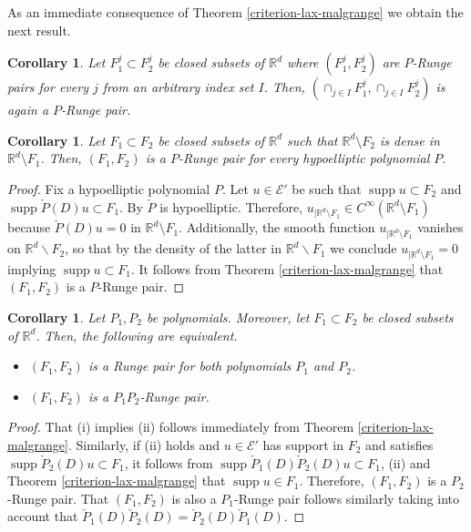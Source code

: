 \documentclass[10pt,leqno]{amsart}
\newtheorem{corollary}[prop]{Corollary}
\theoremstyle{definition}
\newcommand{\R}{\mathbb R}
\newcommand{\supp}{\operatorname{supp}}
\begin{document}
As an immediate consequence of Theorem \ref{criterion-lax-malgrange} we obtain the next result.

\begin{corollary}\label{corollary:intersections}
	Let $F^j_1\subset F^j_2$ be closed subsets of $\R^d$ where $(F_1^j,F_2^j)$ are $P$-Runge pairs for every $j$ from an arbitrary index set $I$. Then, $\left(\cap_{j\in I}F_1^j, \cap_{j\in I}F_2^j\right)$ is again a $P$-Runge pair.
\end{corollary}

\begin{corollary}\label{corollary:general result for hypoelliptic}
	Let $F_1\subset F_2$ be closed subsets of $\R^d$ such that $\R^d\setminus F_2$ is dense in $\R^d\setminus F_1$. Then, $(F_1, F_2)$ is a $P$-Runge pair for every hypoelliptic polynomial $P$.
\end{corollary}

\begin{proof}
	Fix a hypoelliptic polynomial $P$. Let $u\in\mathscr{E}'$ be such that $\supp u\subset F_2$ and $\supp\check{P}(D)u\subset F_1$. By \cite[Theorem 11.1.3]{Hor2} $\check{P}$ is hypoelliptic. Therefore, $u_{\mid\R^d\setminus F_1}\in C^\infty(\R^d\setminus F_1)$ because $\check{P}(D)u=0$ in $\R^d\setminus F_1$. Additionally, the smooth function $u_{\mid\R^d\setminus F_1}$ vanishes on $\R^d\backslash F_2$, so that by the density of the latter in $\R^d\backslash F_1$ we conclude $u_{\mid\R^d\setminus F_1}=0$ implying $\supp u\subset F_1$. It follows from Theorem \ref{criterion-lax-malgrange} that $(F_1, F_2)$ is a $P$-Runge pair.
\end{proof}

\begin{corollary}\label{corollary:compositions}
	Let $P_1,P_2$ be polynomials. Moreover, let $F_1\subset F_2$ be closed subsets of $\R^d$. Then, the following are equivalent.
	\begin{itemize}
		\item[(i)] $(F_1, F_2)$ is a Runge pair for both polynomials $P_1$ and $P_2$.
		\item[(ii)] $(F_1, F_2)$ is a $P_1 P_2$-Runge pair. 
	\end{itemize}
\end{corollary}

\begin{proof}
	That (i) implies (ii) follows immediately from Theorem \ref{criterion-lax-malgrange}. Similarly, if (ii) holds and $u\in\mathscr{E}'$ has support in $F_2$ and satisfies $\supp \check{P}_2(D)u\subset F_1$, it follows from $\supp \check{P}_1(D)\check{P}_2(D)u\subset F_1$, (ii) and Theorem \ref{criterion-lax-malgrange} that $\supp u\in F_1$. Therefore, $(F_1, F_2)$ is a $P_2$-Runge pair. That $(F_1, F_2)$ is also a $P_1$-Runge pair follows similarly taking into account that $\check{P}_1(D)\check{P}_2(D)=\check{P}_2(D)\check{P}_1(D)$.
\end{proof}
\end{document}
